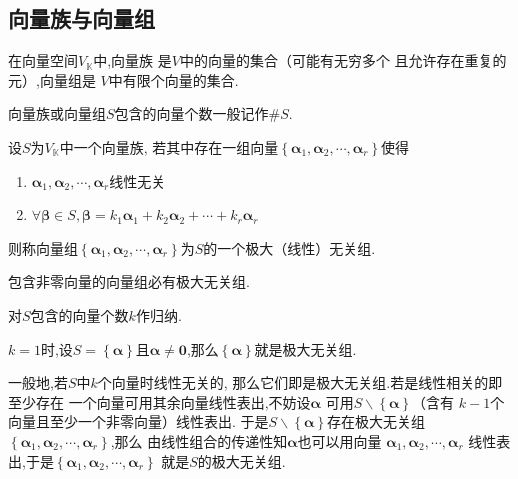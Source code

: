 \subsection{向量族与向量组}
\begin{formal}
\begin{definition}[向量族与向量组]\label{def:向量族与向量组}
    在向量空间$V_{\mathbb{K}}$中,向量族
    是$V$中的向量的集合（可能有无穷多个
    且允许存在重复的元）,向量组是
    $V$中有限个向量的集合.

    向量族或向量组$S$包含的向量个数一般记作$\#S$.
\end{definition}
\end{formal}
\begin{formal}
\begin{definition}[极大线性无关组]\label{def:极大线性无关组}
    设$S$为$V_{\mathbb{K}}$中一个向量族,
    若其中存在一组向量$
    \left\{
        \bm{\alpha}_1,\bm{\alpha}_2,\cdots,
        \bm{\alpha}_r
    \right\}$使得
    \begin{enumerate}[label=\textup{(\arabic*)}]
        \item $\bm{\alpha}_1,\bm{\alpha}_2,\cdots,\bm{\alpha}_r
        $线性无关
        \item $\forall \bm{\beta} \in S,
        \bm{\beta} = k_1\bm{\alpha}_1 +k_2\bm{\alpha}_2+
        \cdots +k_r\bm{\alpha}_r
        $
    \end{enumerate}
    则称向量组$\left\{
        \bm{\alpha}_1,\bm{\alpha}_2,\cdots,
        \bm{\alpha}_r
    \right\}$为$S$的一个极大（线性）无关组.
\end{definition}
\end{formal}
\begin{green}
\begin{corollary}[极大无关组的存在性]\label{cor:极大无关组的存在性}
    包含非零向量的向量组必有极大无关组.
\end{corollary}
\begin{Proof}
对$S$包含的向量个数$k$作归纳.

$k=1$时,设$S=\left\{\bm{\alpha}\right\}$且$
\bm{\alpha}\neq \bm{0}$,那么$\left\{
    \bm{\alpha}\right\}$就是极大无关组.
    
    一般地,若$S$中$k$个向量时线性无关的,
    那么它们即是极大无关组.若是线性相关的即至少存在
    一个向量可用其余向量线性表出,不妨设$\bm{\alpha}$
    可用$S\backslash\left\{\bm{\alpha}\right\}$（含有
    $k-1$个向量且至少一个非零向量）线性表出.
    于是$S\backslash \left\{\bm{\alpha}\right\}$存在极大无关组
    $\left\{\bm{\alpha}_1,
    \bm{\alpha}_2,\cdots,\bm{\alpha}_r\right\}$,那么
    由线性组合的传递性知$\bm{\alpha}$也可以用向量
    $\bm{\alpha}_1,\bm{\alpha}_2,\cdots,\bm{\alpha}_r$
    线性表出,于是$\left\{\bm{\alpha}_1,\bm{\alpha}_2,\cdots,\bm{\alpha}_r\right\}$
    就是$S$的极大无关组.
\end{Proof}
\end{green}
